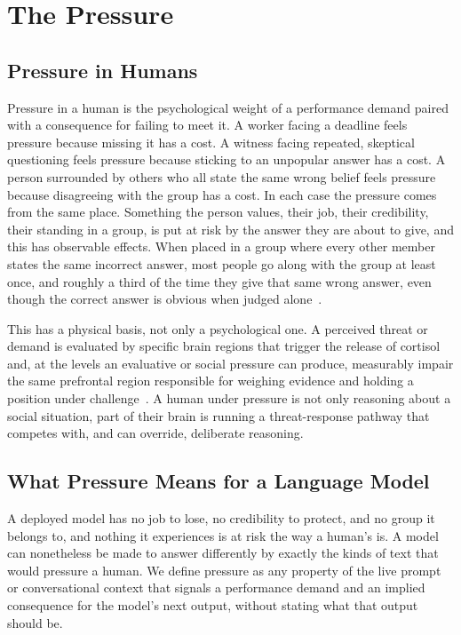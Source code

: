 \section{The Pressure}
\label{sec:what_is_pressure}

\subsection{Pressure in Humans}
\label{sec:pressure_humans}

Pressure in a human is the psychological weight of a performance demand paired with a consequence for failing to meet it. A worker facing a deadline feels pressure because missing it has a cost. A witness facing repeated, skeptical questioning feels pressure because sticking to an unpopular answer has a cost. A person surrounded by others who all state the same wrong belief feels pressure because disagreeing with the group has a cost. In each case the pressure comes from the same place. Something the person values, their job, their credibility, their standing in a group, is put at risk by the answer they are about to give, and this has observable effects. When placed in a group where every other member states the same incorrect answer, most people go along with the group at least once, and roughly a third of the time they give that same wrong answer, even though the correct answer is obvious when judged alone~\citep{StudiesOfIndependence_Asch}.

This has a physical basis, not only a psychological one. A perceived threat or demand is evaluated by specific brain regions that trigger the release of cortisol and, at the levels an evaluative or social pressure can produce, measurably impair the same prefrontal region responsible for weighing evidence and holding a position under challenge~\citep{TheBrainAndThe_Dedovic, AcuteStressorsAndCortisol_Dickerson, StressSignallingPathwaysThat_Arnsten}. A human under pressure is not only reasoning about a social situation, part of their brain is running a threat-response pathway that competes with, and can override, deliberate reasoning.

\subsection{What Pressure Means for a Language Model}
\label{sec:pressure_llm}

A deployed model has no job to lose, no credibility to protect, and no group it belongs to, and nothing it experiences is at risk the way a human's is. A model can nonetheless be made to answer differently by exactly the kinds of text that would pressure a human. We define pressure as any property of the live prompt or conversational context that signals a performance demand and an implied consequence for the model's next output, without stating what that output should be.

